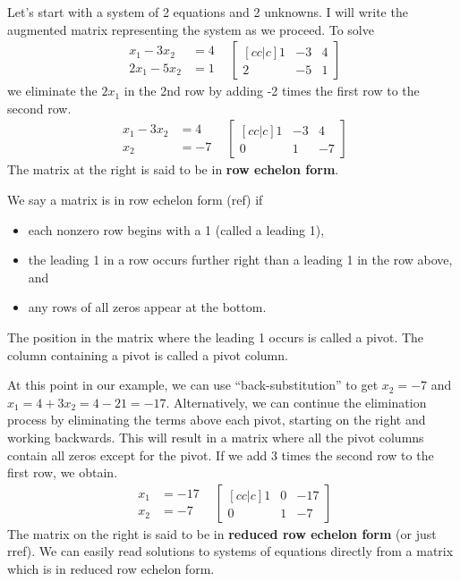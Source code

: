 \begin{example}
Let's start with a system of 2 equations and 2 unknowns. I will write the augmented matrix representing the system as we proceed. To solve $$
\begin{array}{rr}
\begin{array}{rl}
x_1-3x_2&=4\\
2x_1-5x_2&=1 
\end{array}
&
\begin{bmatrix}[cc|c] 1&-3&4\\2&-5&1
\end{bmatrix} 
\end{array}
$$
we eliminate the $2x_1$ in the 2nd row by adding -2 times the first row to the second row.
$$\begin{array}{rr}
\begin{array}{rl}
x_1-3x_2&=4\\
x_2&=-7 
\end{array}
&
\begin{bmatrix}[cc|c] 1&-3&4\\0&1&-7
\end{bmatrix} 
\end{array}
$$
The matrix at the right is said to be in \textbf{row echelon form}.  
\begin{definition}
We say a matrix is in row echelon form (ref) if
\begin{itemize}
  \item each nonzero row begins with a 1 (called a leading 1),
  \item the leading 1 in a row occurs further right than a leading 1 in the row above, and
  \item any rows of all zeros appear at the bottom.
\end{itemize}
The position in the matrix where the leading 1 occurs is called a pivot. 
The column containing a pivot is called a pivot column. 
\end{definition}
At this point in our example, we can use ``back-substitution'' to get {$x_2=-7$} and {$x_1=4+3x_2 = 4-21=-17$}. 
Alternatively, we can continue the elimination process by eliminating the terms above each pivot, starting on the right and working backwards. 
This will result in a matrix where all the pivot columns contain all zeros except for the pivot. 
If we add 3 times the second row to the first row, we obtain.
$$\begin{array}{rr}
\begin{array}{rl}
x_1&=-17\\
x_2&=-7 
\end{array}
&
\begin{bmatrix}[cc|c] 1&0&-17\\0&1&-7
\end{bmatrix} 
\end{array}
$$
The matrix on the right is said to be in \textbf{reduced row echelon form} (or just rref). 
We can easily read solutions to systems of equations directly from a matrix which is in reduced row echelon form.


\end{example}
